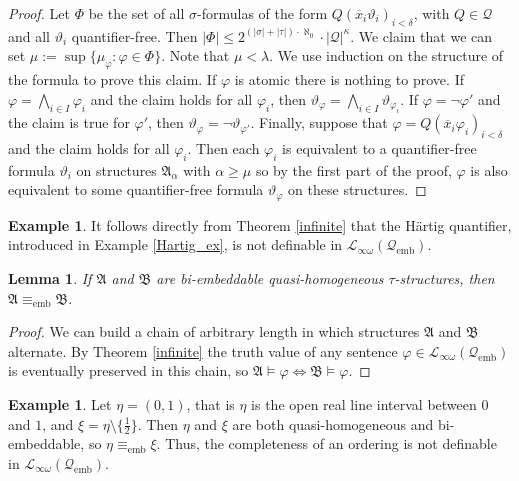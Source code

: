 \documentclass{ndjflart}
\theoremstyle{plain}
\newtheorem{lemma}[conjecture]{Lemma}
\theoremstyle{definition}
\newtheorem{example}[conjecture]{Example}
\numberwithin{equation}{section}
\DeclareMathOperator{\emb}{emb}
\begin{document}
\begin{proof}
Let $\Phi$ be the set of all $\sigma$-formulas of the form
$Q(\overline{x}_i\vartheta_i)_{i<\delta}$,
with $Q\in\mathcal{Q}$ and all $\vartheta_i$ quantifier-free.
Then 
$|\Phi| \leq 2^{(|\sigma| + |\tau|) \cdot \aleph_0} \cdot |\mathcal{Q}|^{\kappa}$.
We claim that we can set
$\mu := \sup\{\mu_{\varphi} \colon \varphi \in \Phi \}$.
Note that $\mu < \lambda$.
We use induction on the structure of the formula to prove this claim.
If $\varphi$ is atomic there is nothing to prove.
If $\varphi = \bigwedge_{i \in I} \varphi_i$ and the claim holds for all
$\varphi_i$, then 
$\vartheta_{\varphi} = \bigwedge_{i\in I}\vartheta_{\varphi_i}$.
If $\varphi = \neg \varphi'$ and the claim is true for $\varphi'$,
then $\vartheta_{\varphi} = \neg \vartheta_{\varphi'}$.
Finally, suppose that $\varphi = Q(\overline{x}_i \varphi_i)_{i < \delta}$ 
and the claim holds for all $\varphi_i$.
Then each $\varphi_i$ is equivalent to a quantifier-free formula $\vartheta_i$
on structures $\mathfrak{A}_{\alpha}$ with $\alpha \geq \mu$ so by the first part
of the proof, $\varphi$ is also equivalent to some quantifier-free formula
$\vartheta_{\varphi}$ on these structures.
\end{proof}

\begin{example}\label{Hartig}
It follows directly from Theorem \ref{infinite} that
the H\"artig quantifier, introduced in Example \ref{Hartig_ex}, is not definable
in $\mathcal{L}_{\infty\omega}(\mathcal{Q}_{\emb})$.
\end{example}

\begin{lemma}
If $\mathfrak{A}$ and $\mathfrak{B}$ are bi-embeddable quasi-homogeneous
$\tau$-structures, then $\mathfrak{A} \equiv_{\emb} \mathfrak{B}$.
\end{lemma}
\begin{proof}
We can build a chain of arbitrary length in which structures $\mathfrak{A}$ and
$\mathfrak{B}$ alternate.
By Theorem \ref{infinite} the truth value of any sentence 
$\varphi \in \mathcal{L}_{\infty\omega}(\mathcal{Q}_{\emb})$ 
is eventually preserved in this chain, so 
$\mathfrak{A} \vDash \varphi \Leftrightarrow \mathfrak{B} \vDash \varphi$.
\end{proof}

\begin{example}\label{completeness}
Let $\eta = (0,1)$, that is $\eta$ is the open real line interval between $0$
and $1$, and $\xi = \eta \setminus \{\frac{1}{2}\}$.
Then $\eta$ and $\xi$ are both quasi-homogeneous and bi-embeddable, so
$\eta \equiv_{\emb} \xi$.
Thus, the completeness of an ordering is not definable in
$\mathcal{L}_{\infty \omega}(\mathcal{Q}_{\emb})$.
\end{example}
\end{document}
